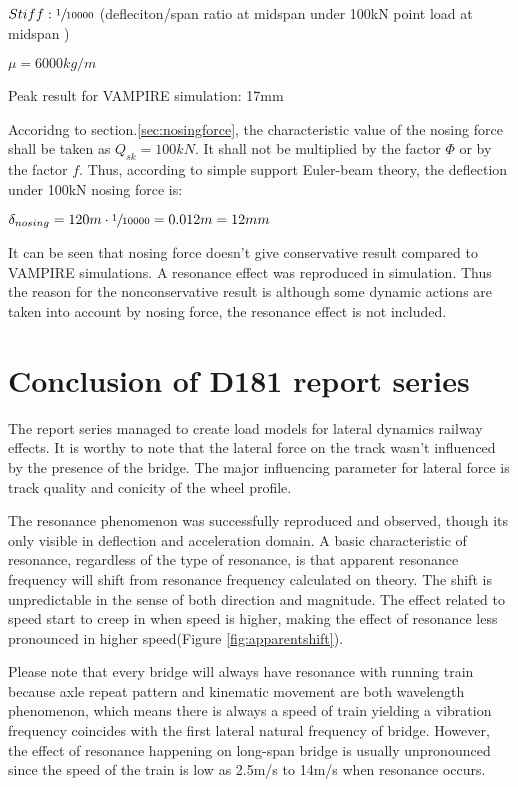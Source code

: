 $Stiff: \sfrac{1}{10000}$  (defleciton/span ratio at midspan under 100kN point load at midspan )

$\mu = 6000kg/m$

Peak result for VAMPIRE simulation: 17mm

Accoridng to section.\ref{sec:nosingforce}, the characteristic value of the nosing force shall be taken as $Q_{sk} = 100kN$. It shall not be multiplied by the factor $\Phi$ or by the factor $f$. Thus, according to simple support Euler-beam theory, the deflection under 100kN nosing force is:

$\delta_{nosing} = 120m \cdot \sfrac{1}{10000} = 0.012m = 12mm$

It can be seen that nosing force doesn't give conservative result compared to VAMPIRE simulations. A resonance effect was reproduced in simulation. Thus the  reason for the nonconservative result is although some dynamic actions are taken into account by nosing force, the resonance effect is not included.


\section{Conclusion of D181 report series}
The report series managed to create load models for lateral dynamics railway effects. It is worthy to note that the lateral force on the track wasn't influenced by the presence of the bridge. The major influencing parameter for lateral force is track quality and conicity of the wheel profile. 

The resonance phenomenon was successfully reproduced and observed, though its only visible in deflection and acceleration domain. A basic characteristic of resonance, regardless of the type of resonance, is that apparent resonance frequency will shift from resonance frequency calculated on theory. The shift is unpredictable in the sense of both direction and magnitude. The effect related to speed start to creep in when speed is higher, making the effect of resonance less pronounced in higher speed(Figure \ref{fig:apparentshift}). 

Please note that every bridge will always have resonance with running train because axle repeat pattern and kinematic movement are both wavelength phenomenon, which means there is always a speed of train yielding a vibration frequency coincides with the first lateral natural frequency of bridge. However, the effect of resonance happening on long-span bridge is usually unpronounced since the speed of the train is low as 2.5m/s to 14m/s when resonance occurs.  

